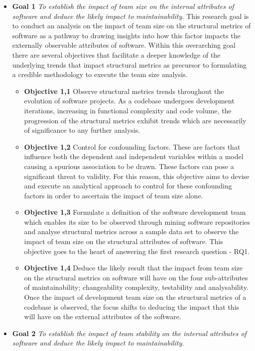 \begin{itemize}
\item  \textbf{Goal 1} \textit{To establish the impact of team size on the internal attributes of software and deduce the likely impact to maintainability.} 
This research goal is to conduct an analysis on the impact of team size on the structural metrics of software as a pathway to drawing insights into how this factor impacts the externally observable attributes of software. Within this overarching goal there are several objectives that facilitate a deeper knowledge of the underlying trends that impact structural metrics as precursor to formulating a credible methodology to execute the team size analysis.
\begin{itemize}
\item \textbf{Objective 1,1} Observe structural metrics trends throughout the evolution of software projects. As a codebase undergoes development iterations, increasing in functional complexity and code volume, the progression of the structural metrics exhibit trends which are necessarily of significance to any further analysis. 
\item \textbf{Objective 1,2} Control for confounding factors. These are factors that influence both the dependent and independent variables within a model causing a spurious association to be drawn. These factors can pose a significant threat to validity. For this reason, this objective aims to devise and execute an analytical approach to control for these confounding factors in order to ascertain the impact of team size alone.
\item \textbf{Objective 1,3} Formulate a definition of the software development team which enables its size to be observed through mining software repositories and analyse structural metrics across a sample data set to observe the impact of team size on the structural attributes of software. This objective goes to the heart of answering the first research question - RQ1.
\item \textbf{Objective 1,4} Deduce the likely result that the impact from team size on the structural metrics on software will have on the four sub-attributes of maintainability; changeability complexity, testability and analysability. Once the impact of development team size on the structural metrics of a codebase is observed, the focus shifts to deducing the impact that this will have on the external attributes of the software.
\end{itemize}
\item  \textbf{Goal 2} \textit{To establish the impact of team stability on the internal attributes of software and deduce the likely impact to maintainability.}

\end{itemize}
